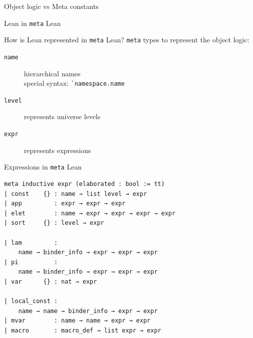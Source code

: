 \documentclass[usenames,dvipsnames]{beamer}
\newcommand{\sect}[1]{\begin{frame}
  \begin{center} \Huge{\usebeamercolor[fg]{structure} #1} \end{center}
  \end{frame}
  }
\begin{document}
\begin{frame}{Object logic vs Meta constants}

\end{frame}

\sect{Lean in \lstinline{meta} Lean}

\begin{frame}[fragile]{How is Lean represented in \lstinline{meta} Lean?}
  \lstinline{meta} types to represent the object logic:
  \begin{description}
    \item[\texttt{name}] hierarchical names \\
      special syntax: \verb$`namespace.name$
    \item[\texttt{level}] represents universe levels
    \item[\texttt{expr}] represents expressions
  \end{description}
\end{frame}

\begin{frame}[fragile]{Expressions in \lstinline{meta} Lean}
\begin{lstlisting}
meta inductive expr (elaborated : bool := tt)
| const    {} : name → list level → expr
| app         : expr → expr → expr
| elet        : name → expr → expr → expr → expr
| sort     {} : level → expr

| lam         :
    name → binder_info → expr → expr → expr
| pi          :
    name → binder_info → expr → expr → expr
| var      {} : nat → expr

| local_const :
    name → name → binder_info → expr → expr
| mvar        : name → name → expr → expr
| macro       : macro_def → list expr → expr
\end{lstlisting}
\end{frame}
\end{document}
